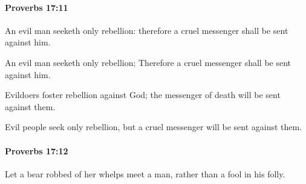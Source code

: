 		\paragraph{Proverbs 17:11} %
			\label{PROVERBS-17-11}

			An evil man seeketh only rebellion: therefore a cruel messenger shall be sent against him.

			\begin{versebox}
					\item[BHS] 
					\item[ASV] An evil man seeketh only rebellion; Therefore a cruel messenger shall be sent against him.
					\item[NIV] Evildoers foster rebellion against God; the messenger of death will be sent against them.
					\item[NRSV] Evil people seek only rebellion, but a cruel messenger will be sent against them.
			\end{versebox}

		\paragraph{Proverbs 17:12} %
			\label{PROVERBS-17-12}

			Let a bear robbed of her whelps meet a man, rather than a fool in his folly.


